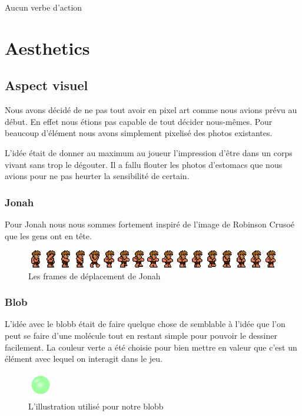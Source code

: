 \documentclass{prologArticle}
\begin{document}
Aucun verbe d'action




\section{Aesthetics}

\subsection{Aspect visuel}
Nous avons décidé de ne pas tout avoir en pixel art comme nous avions prévu au début. En effet nous étions pas capable de tout décider nous-mêmes. Pour beaucoup d'élément nous avons simplement pixelisé des photos existantes.

L'idée était de donner au maximum au joueur l'impression d'être dans un corps vivant sans trop le dégouter. Il a fallu flouter les photos d'estomacs que nous avions pour ne pas heurter la sensibilité de certain.

\subsubsection{Jonah}
Pour Jonah nous nous sommes fortement inspiré de l'image de Robinson Crusoé que les gens ont en tête.

\begin{figure}[H]
    \centering
    \includegraphics[width=\textwidth]{res/jona_sheet.png}
    \caption{Les frames de déplacement de Jonah}
\end{figure}

\subsubsection{Blob}
L'idée avec le blobb était de faire quelque chose de semblable à l'idée que l'on peut se faire d'une molécule tout en restant simple pour pouvoir le dessiner facilement. La couleur verte a été choisie pour bien mettre en valeur que c'est un élément avec lequel on interagit dans le jeu.

\begin{figure}[H]
    \centering
    \includegraphics[width=0.1\textwidth]{res/blobb.png}
    \caption{L'illustration utilisé pour notre blobb}
\end{figure}
\end{document}
